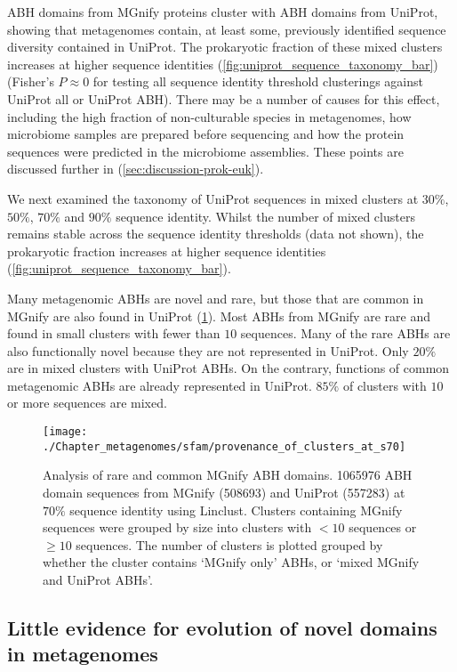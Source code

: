 ABH domains from MGnify proteins cluster with ABH domains from UniProt, showing that metagenomes contain, at least some, previously identified sequence diversity contained in UniProt.
The prokaryotic fraction of these mixed clusters increases at higher sequence identities (\ref{fig:uniprot_sequence_taxonomy_bar}) (Fisher's $P \approx 0$ for testing all sequence identity threshold clusterings against UniProt all or UniProt ABH). There may be a number of causes for this effect, including the high fraction of non-culturable species in metagenomes, how microbiome samples are prepared before sequencing and how the protein sequences were predicted in the microbiome assemblies. These points are discussed further in (\ref{sec:discussion-prok-euk}).

We next examined the taxonomy of UniProt sequences in mixed clusters at $30\%$, $50\%$, $70\%$ and $90\%$ sequence identity. Whilst the number of mixed clusters remains stable across the sequence identity thresholds (data not shown), the prokaryotic fraction increases at higher sequence identities (\ref{fig:uniprot_sequence_taxonomy_bar}).

Many metagenomic ABHs are novel and rare, but those that are common in MGnify are also found in UniProt (\ref{fig:provenance_of_clusters_at_s70}). Most ABHs from MGnify are rare and found in small clusters with fewer than $10$ sequences. Many of the rare ABHs are also functionally novel because they are not represented in UniProt. Only $20\%$ are in mixed clusters with UniProt ABHs. On the contrary, functions of common metagenomic ABHs are already represented in UniProt. $85\%$ of clusters with $10$ or more sequences are mixed.

\begin{figure}[!hbt]
    \centering
    \texttt{[image: ./Chapter\_metagenomes/sfam/provenance\_of\_clusters\_at\_s70]}
    \caption{%
        Analysis of rare and common MGnify ABH domains.
        \num{1065976} ABH domain sequences from MGnify (\num{508693}) and UniProt (\num{557283}) at $70\%$ sequence identity using Linclust.
        Clusters containing MGnify sequences were grouped by size into clusters with $< 10$ sequences or $\ge 10$ sequences.
        The number of clusters is plotted grouped by whether the cluster contains `MGnify only' ABHs, or `mixed MGnify and UniProt ABHs'.
    }
    \label{fig:provenance_of_clusters_at_s70}
\end{figure}

\subsection{Little evidence for evolution of novel domains in metagenomes}

